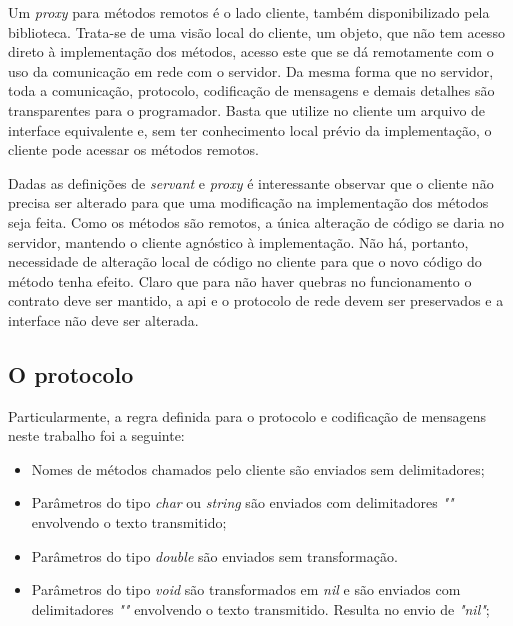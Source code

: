 \documentclass[11pt]{article}
\begin{document}
Um \textit{proxy} para métodos remotos é o lado cliente, também disponibilizado
pela biblioteca. Trata-se de uma visão local do cliente, um objeto, que não tem
acesso direto à implementação dos métodos, acesso este que se dá remotamente com
o uso da comunicação em rede com o servidor. Da mesma forma que no servidor,
toda a comunicação, protocolo, codificação de mensagens e demais detalhes são
transparentes para o programador. Basta que utilize no cliente um arquivo de
interface equivalente e, sem ter conhecimento local prévio da implementação, o
cliente pode acessar os métodos remotos.

Dadas as definições de \textit{servant} e \textit{proxy} é interessante observar
que o cliente não precisa ser alterado para que uma modificação na implementação
dos métodos seja feita. Como os métodos são remotos, a única alteração de código
se daria no servidor, mantendo o cliente agnóstico à implementação. Não há,
portanto, necessidade de alteração local de código no cliente para que o novo
código do método tenha efeito. Claro que para não haver quebras no funcionamento
o contrato deve ser mantido, a \gls{api} e o protocolo de rede devem ser
preservados e a interface não deve ser alterada.

\subsection{O protocolo}\label{subsec:proto}

Particularmente, a regra definida para o protocolo e codificação de mensagens
neste trabalho foi a seguinte:

\begin{itemize}
\item

    Nomes de métodos chamados pelo cliente são enviados sem delimitadores;

\item

    Parâmetros do tipo \textit{char} ou \textit{string} são enviados com
    delimitadores \textit{""} envolvendo o texto transmitido;

\item

    Parâmetros do tipo \textit{double} são enviados sem transformação.

\item

    Parâmetros do tipo \textit{void} são transformados em \textit{nil} e são
    enviados com delimitadores \textit{""} envolvendo o texto transmitido.
    Resulta no envio de \textit{"nil"};

\end{itemize}
\end{document}

